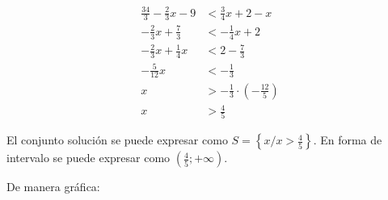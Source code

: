 \begin{align*}
	\frac{34}{3} - \frac{2}{3}x - 9 & < \frac{3}{4}x + 2 - x                             \\
	- \frac{2}{3}x + \frac{7}{3}    & < - \frac{1}{4}x + 2                               \\
	- \frac{2}{3}x + \frac{1}{4}x   & < 2 - \frac{7}{3}                                  \\
	- \frac{5}{12}x                 & < - \frac{1}{3}                                    \\
	x                               & > - \frac{1}{3} \cdot \left(- \frac{12}{5} \right) \\
	x                               & > \boxed{\frac{4}{5}}
\end{align*}

El conjunto solución se puede expresar como $S=\left\{ x / x > \frac{4}{5} \right\}$.
En forma de intervalo se puede expresar como $\left(\frac{4}{5};+\infty\right)$.

De manera gráfica:
\vspace{1cm}

\begin{center}
\end{center}
